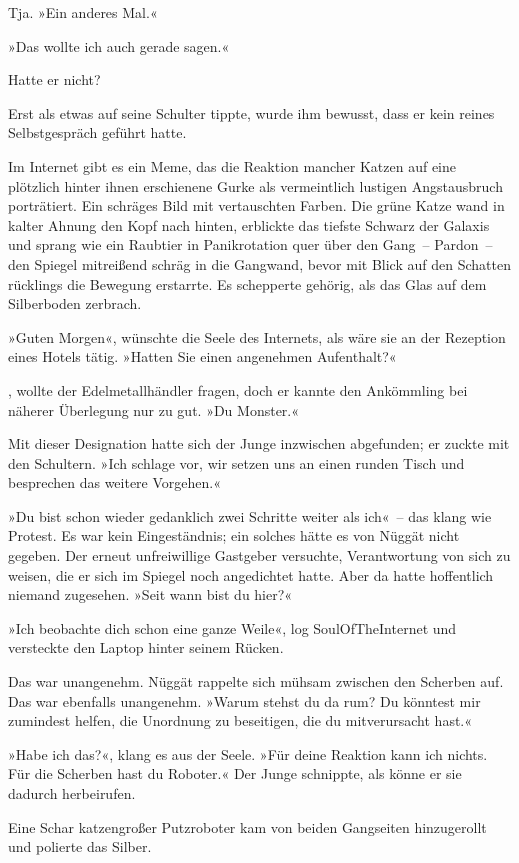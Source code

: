 Tja. »Ein anderes Mal.«

»Das wollte ich auch gerade sagen.«

Hatte er nicht?

Erst als etwas auf seine Schulter tippte, wurde ihm bewusst, dass er kein reines Selbstgespräch geführt hatte.

Im Internet gibt es ein Meme, das die Reaktion mancher Katzen auf eine plötzlich hinter ihnen erschienene Gurke als vermeintlich lustigen Angstausbruch porträtiert. Ein schräges Bild mit vertauschten Farben. Die grüne Katze wand in kalter Ahnung den Kopf nach hinten, erblickte das tiefste Schwarz der Galaxis und sprang wie ein Raubtier in Panikrotation quer über den Gang~– Pardon~– den Spiegel mitreißend schräg in die Gangwand, bevor mit Blick auf den Schatten rücklings die Bewegung erstarrte. Es schepperte gehörig, als das Glas auf dem Silberboden zerbrach.

»Guten Morgen«, wünschte die Seele des Internets, als wäre sie an der Rezeption eines Hotels tätig. »Hatten Sie einen angenehmen Aufenthalt?«

, wollte der Edelmetallhändler fragen, doch er kannte den Ankömmling bei näherer Überlegung nur zu gut. »Du Monster.«

Mit dieser Designation hatte sich der Junge inzwischen abgefunden; er zuckte mit den Schultern. »Ich schlage vor, wir setzen uns an einen runden Tisch und besprechen das weitere Vorgehen.«

»Du bist schon wieder gedanklich zwei Schritte weiter als ich«~– das klang wie Protest. Es war kein Eingeständnis; ein solches hätte es von Nüggät nicht gegeben. Der erneut unfreiwillige Gastgeber versuchte, Verantwortung von sich zu weisen, die er sich im Spiegel noch angedichtet hatte. Aber da hatte hoffentlich niemand zugesehen. »Seit wann bist du hier?«

»Ich beobachte dich schon eine ganze Weile«, log SoulOfTheInternet und versteckte den Laptop hinter seinem Rücken.

Das war unangenehm. Nüggät rappelte sich mühsam zwischen den Scherben auf. Das war ebenfalls unangenehm. »Warum stehst du da rum? Du könntest mir zumindest helfen, die Unordnung zu beseitigen, die du mitverursacht hast.«

»Habe ich das?«, klang es aus der Seele. »Für deine Reaktion kann ich nichts. Für die Scherben hast du Roboter.« Der Junge schnippte, als könne er sie dadurch herbeirufen.

Eine Schar katzengroßer Putzroboter kam von beiden Gangseiten hinzugerollt und polierte das Silber.

